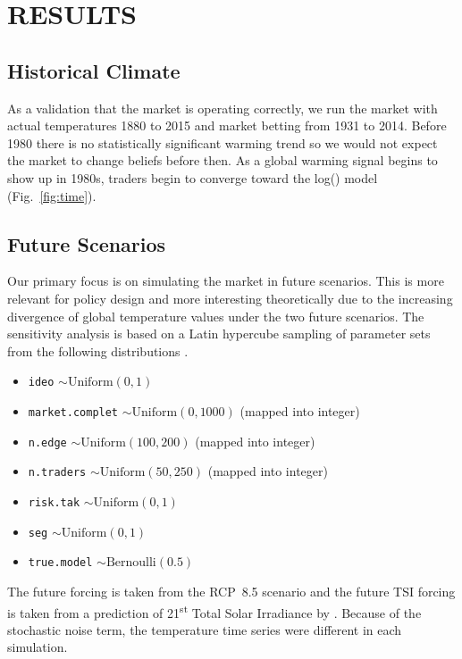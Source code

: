 \documentclass{wscpaperproc}\usepackage[]{graphicx}\usepackage[]{color}
\begin{document}
\section{RESULTS}

\subsection{Historical Climate}

As a validation that the market is operating correctly, we run the market with actual temperatures 1880 to 2015 and market betting from 1931 to 2014. Before 1980 there is no statistically significant warming trend so we would not expect the market to change beliefs before then. As a global warming signal begins to show up in 1980s, traders begin to converge toward the log() model (Fig.~\ref{fig:time}).

\subsection{Future Scenarios}

Our primary focus is on simulating the market in future scenarios. This is more relevant for policy design and more interesting theoretically due to the increasing divergence of global temperature values under the two future scenarios. The sensitivity analysis is based on a Latin hypercube sampling of parameter sets from the following distributions . 

\begin{itemize}
  \item \texttt{ideo} $\sim \text{Uniform}(0,1)$
  \item \texttt{market.complet} $\sim \text{Uniform}(0,1000)$ (mapped into integer)
  \item \texttt{n.edge} $\sim \text{Uniform}(100,200)$ (mapped into integer)
  \item \texttt{n.traders} $\sim \text{Uniform}(50,250)$ (mapped into integer)
  \item \texttt{risk.tak}  $\sim \text{Uniform}(0,1)$
  \item \texttt{seg} $\sim \text{Uniform}(0,1)$
  \item \texttt{true.model} $\sim \text{Bernoulli}(0.5)$
\end{itemize}

The future  forcing is taken from the RCP~8.5 scenario  and the future TSI forcing is taken from a prediction of 21\textsuperscript{st} Total Solar Irradiance by . Because of the stochastic noise term, the temperature time series were different in each simulation.
\end{document}
